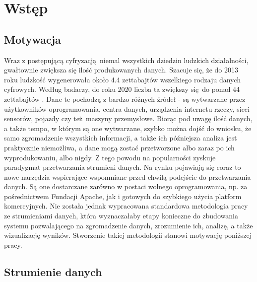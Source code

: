 \chapter{Wstęp}

\section{Motywacja}

Wraz z postępującą cyfryzacją niemal wszystkich dziedzin ludzkich działalności, gwałtownie zwiększa się ilość produkowanych danych. Szacuje się, że do 2013 roku ludzkość wygenerowała około 4.4 zettabajtów wszelkiego rodzaju danych cyfrowych. Według badaczy, do roku 2020 liczba ta zwiększy się do ponad 44 zettabajtów \cite{EMCCorpReport}. Dane te pochodzą z bardzo różnych źródeł - są wytwarzane przez użytkowników oprogramowania, centra danych, urządzenia internetu rzeczy, sieci sensorów, pojazdy czy też maszyny przemysłowe.  Biorąc pod uwagę ilość danych, a także tempo, w którym są one wytwarzane, szybko można dojść do wniosku, że samo zgromadzenie wszystkich informacji, a także ich późniejsza analiza jest praktycznie niemożliwa, a dane mogą zostać przetworzone albo zaraz po ich wyprodukowaniu, albo nigdy. Z tego powodu na popularności zyskuje paradygmat przetwarzania strumieni danych. Na rynku pojawiają się coraz to nowe narzędzia wspierające wspomniane przed chwilą podejście do przetwarzania danych. Są one dostarczane zarówno w postaci wolnego oprogramowania, np. za pośrednictwem Fundacji Apache, jak i gotowych do szybkiego użycia platform komercyjnych. Nie została jednak wypracowana standardowa metodologia pracy ze strumieniami danych, która wyznaczałaby etapy konieczne do zbudowania systemu pozwalającego na zgromadzenie danych, zrozumienie ich, analizę, a także wizualizację wyników. Stworzenie takiej metodologii stanowi motywację poniższej pracy.

\section{Strumienie danych}

